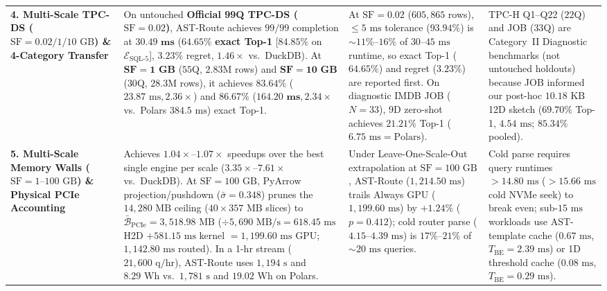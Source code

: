 \documentclass[10pt,a4paper]{article}
\newenvironment{fitasttable}{%
  \begin{lrbox}{\asttblbox}%
}{%
  \end{lrbox}%
  \sbox{\asttblboxB}{%
    \ifdim\wd\asttblbox>0.96\textwidth
      \resizebox{0.96\textwidth}{!}{\usebox{\asttblbox}}%
    \else
      \usebox{\asttblbox}%
    \fi
  }%
  \ifdim\ht\asttblboxB>0.72\textheight
    \resizebox{!}{0.72\textheight}{\usebox{\asttblboxB}}%
  \else
    \usebox{\asttblboxB}%
  \fi
}
\begin{document}
\begin{table}[!htbp]
{\begin{fitasttable}
\begin{tabular}{@{}p{2.6cm}p{4.6cm}p{4.3cm}p{4.5cm}@{}}
\textbf{4. Multi-Scale TPC-DS ($\text{SF}=0.02 / 1 / 10\text{ GB}$) \& 4-Category Transfer} & On untouched \textbf{Official 99Q TPC-DS ($\text{SF}=0.02$)}, AST-Route achieves $99/99$ completion at $\mathbf{30.49\text{ ms}}$ ($\mathbf{64.65\%}$ \textbf{exact Top-1} [$\mathbf{84.85\%}$ on $\mathcal{E}_{\text{SQL-5}}$], $\mathbf{3.23\%}$ regret, $1.46\times$ vs.\ DuckDB). At $\mathbf{\text{SF}=1\text{ GB}}$ ($55$Q, $2.83\text{M}$ rows) and $\mathbf{\text{SF}=10\text{ GB}}$ ($30$Q, $28.3\text{M}$ rows), it achieves $\mathbf{83.64\%}$ ($23.87\text{ ms}, 2.36\times$) and $\mathbf{86.67\%}$ ($\mathbf{164.20\text{ ms}}, \mathbf{2.34\times}$ vs.\ Polars $384.5\text{ ms}$) exact Top-1. & At $\text{SF}=0.02$ ($605{,}865$ rows), $\le 5\text{ ms}$ tolerance ($93.94\%$) is $\sim 11\%\text{--}16\%$ of $30\text{--}45\text{ ms}$ runtime, so exact Top-1 ($64.65\%$) and regret ($3.23\%$) are reported first. On diagnostic IMDB JOB ($N=33$), 9D zero-shot achieves $\mathbf{21.21\%}$ Top-1 ($6.75\text{ ms} = \text{Polars}$). & TPC-H Q1--Q22 ($22$Q) and JOB ($33$Q) are Category~II Diagnostic benchmarks (not untouched holdouts) because JOB informed our post-hoc $10.18\text{ KB}$ 12D sketch ($69.70\%$ Top-1, $4.54\text{ ms}$; $85.34\%$ pooled). \\
\textbf{5. Multi-Scale Memory Walls ($\text{SF}=1\text{--}100\text{ GB}$) \& Physical PCIe Accounting} & Achieves $1.04\times\text{--}1.07\times$ speedups over the best single engine per scale ($3.35\times\text{--}7.61\times$ vs.\ DuckDB). At $\text{SF}=100\text{ GB}$, PyArrow projection/pushdown ($\bar{\sigma}=0.348$) prunes the $14{,}280\text{ MB}$ ceiling ($40\times 357\text{ MB}$ slices) to $\bar{\mathcal{B}}_{\text{PCIe}}=3{,}518.98\text{ MB}$ ($\div 5{,}690\text{ MB/s}=618.45\text{ ms}$ H2D $+581.15\text{ ms}$ kernel $=1{,}199.60\text{ ms}$ GPU; $1{,}142.80\text{ ms}$ routed). In a 1-hr stream ($21{,}600\text{ q/hr}$), AST-Route uses $1{,}194\text{ s}$ and $8.29\text{ Wh}$ vs.\ $1{,}781\text{ s}$ and $19.02\text{ Wh}$ on Polars. & Under Leave-One-Scale-Out extrapolation at $\text{SF}=100\text{ GB}$, AST-Route ($1{,}214.50\text{ ms}$) trails Always GPU ($1{,}199.60\text{ ms}$) by $+1.24\%$ ($p=0.412$); cold router parse ($4.15\text{--}4.39\text{ ms}$) is $17\%\text{--}21\%$ of $\sim 20\text{ ms}$ queries. & Cold parse requires query runtimes $>14.80\text{ ms}$ ($>15.66\text{ ms}$ cold NVMe seek) to break even; sub-$15\text{ ms}$ workloads use AST-template cache ($0.67\text{ ms}$, $T_{\text{BE}}=2.39\text{ ms}$) or 1D threshold cache ($0.08\text{ ms}$, $T_{\text{BE}}=0.29\text{ ms}$). \\

\end{tabular}
\end{fitasttable}}
\end{table}
\end{document}
